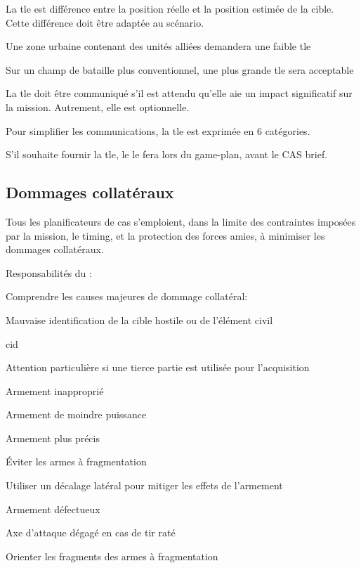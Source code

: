 \e
	\item La \gls{tle} est différence entre la position réelle et la position estimée de la cible. Cette différence doit être adaptée au scénario.

	\ee
		\item Une zone urbaine contenant des unités alliées demandera une faible \gls{tle}
		\item Sur un champ de bataille plus conventionnel, une plus grande \gls{tle} sera acceptable
	\ed
	
	\item La \gls{tle} doit être communiqué s'il est attendu qu'elle aie un impact significatif sur la mission. Autrement, elle est optionnelle.

	\item Pour simplifier les communications, la \gls{tle} est exprimée en 6 catégories.

	
	
	\item S'il souhaite fournir la \gls{tle}, le \ja{} le fera lors du game-plan, avant le CAS brief.
\ed

\subsection{Dommages collatéraux}

Tous les planificateurs de \gls{cas} s'emploient, dans la limite des contraintes imposées par la mission, le timing, et la protection des forces amies, à minimiser les dommages collatéraux.

Responsabilités du \ja{}:

\e
	\item Comprendre les causes majeures de dommage collatéral:
	\ee
		\item Mauvaise identification de la cible hostile ou de l'élément civil
		\eee
			\item \gls{cid}
			\item Attention particulière si une tierce partie est utilisée pour l'acquisition
		\ed
		\item Armement inapproprié
		\eee
			\item Armement de moindre puissance
			\item Armement plus précis
			\item Éviter les armes à fragmentation
			\item Utiliser un décalage latéral pour mitiger les effets de l'armement
		\ed
		\item Armement défectueux
		\eee
			\item Axe d'attaque dégagé en cas de tir raté
			\item Orienter les fragments des armes à fragmentation
		\ed
	\ed
\ed

